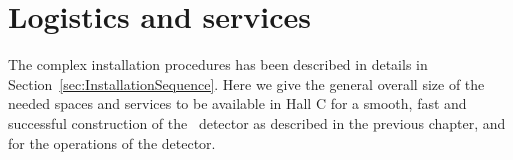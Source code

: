 \newpage

\section{Logistics and services}
\label{sec:TechnicalDesign}



The complex installation procedures has been described in details in Section~\ref{sec:InstallationSequence}. Here we give the general overall size of the needed spaces and services to be available in Hall C for a smooth, fast and successful construction of the \DSks\ detector as described in the previous chapter, and for the operations of the detector.


